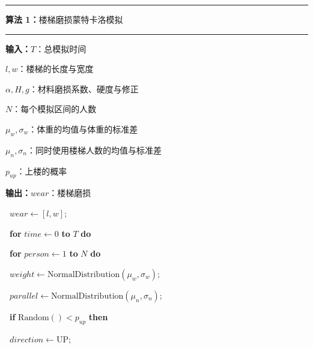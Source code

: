 \documentclass[11pt,a4paper]{ctexart}
\begin{document}
\begingroup
\small
\setlength{\parindent}{0pt}
\setlength{\parskip}{1.5pt}
\noindent\rule{\linewidth}{0.5pt}\par\vspace{2pt}
\noindent\textbf{算法 1：}楼梯磨损蒙特卡洛模拟\par\vspace{2pt}
\noindent\rule{\linewidth}{0.3pt}\par\vspace{3pt}
\noindent\textbf{输入：}$T$：总模拟时间\par
\hspace*{1.2em}$l,w$：楼梯的长度与宽度\par
\hspace*{1.2em}$\alpha,H,g$：材料磨损系数、硬度与修正\par
\hspace*{1.2em}$N$：每个模拟区间的人数\par
\hspace*{1.2em}$\mu_w,\sigma_w$：体重的均值与体重的标准差\par
\hspace*{1.2em}$\mu_n,\sigma_n$：同时使用楼梯人数的均值与标准差\par
\hspace*{1.2em}$p_{up}$：上楼的概率\par
\noindent\textbf{输出：}$wear$：楼梯磨损\par\vspace{3pt}
\noindent{}\ $wear \leftarrow [l,w]$;\par
\noindent{}\ \textbf{for} $time \leftarrow 0$ \textbf{to} $T$ \textbf{do}\par
\noindent{}\ \hspace*{1.2em}\textbf{for} $person \leftarrow 1$ \textbf{to} $N$ \textbf{do}\par
\noindent{}\ \hspace*{2.4em}$weight \leftarrow \mathrm{NormalDistribution}(\mu_w,\sigma_w)$;\par
\noindent{}\ \hspace*{2.4em}$parallel \leftarrow \mathrm{NormalDistribution}(\mu_n,\sigma_n)$;\par
\noindent{}\ \hspace*{2.4em}\textbf{if} $\mathrm{Random}() < p_{up}$ \textbf{then}\par
\noindent{}\ \hspace*{3.6em}$direction \leftarrow \mathrm{UP}$;\par
\end{document}
